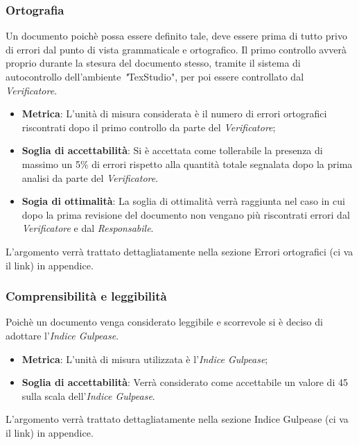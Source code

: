 \subsubsection{Ortografia}
Un documento poichè possa essere definito tale, deve essere prima di tutto privo di errori dal punto di vista grammaticale e ortografico. 
Il primo controllo avverà proprio durante la stesura del documento stesso, tramite il sistema di autocontrollo dell'ambiente  \textit"{TexStudio}", per poi essere controllato dal  \textit{Verificatore}.
\begin{itemize}
	\item \textbf{Metrica}: L'unità di misura considerata è il numero di errori ortografici riscontrati dopo il primo controllo da parte del \textit{Verificatore};
	\item \textbf{Soglia di accettabilità}: Si è accettata come tollerabile la presenza di massimo un 5\% di errori rispetto alla quantità totale segnalata dopo la prima analisi da parte del \textit{Verificatore}.
	\item \textbf{Sogia di ottimalità}: La soglia di ottimalità verrà raggiunta nel caso in cui dopo la prima revisione del documento non vengano più riscontrati errori dal \textit{Verificatore} e dal \textit{Responsabile}.
\end{itemize}
L'argomento verrà trattato dettagliatamente nella sezione Errori ortografici (ci va il link) in appendice.
\subsubsection{Comprensibilità e leggibilità}
Poichè un documento venga considerato leggibile e scorrevole si è deciso di adottare l'\textit{Indice Gulpease}. 
\begin{itemize}
	\item \textbf{Metrica}: L'unità di misura utilizzata è l'\textit{Indice Gulpease};
	\item \textbf{Soglia di accettabilità}: Verrà considerato come accettabile un valore di 45 sulla scala dell'\textit{Indice Gulpease}.
\end{itemize}
L'argomento verrà trattato dettagliatamente nella sezione Indice Gulpease (ci va il link) in appendice.

